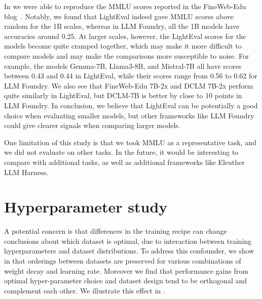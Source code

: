 \documentclass{article}
\begin{document}
In  we were able to reproduce the MMLU scores reported in the FineWeb-Edu blog~\citep{lozhkov2024fineweb-edu}.
Notably, we found that LightEval indeed gave MMLU scores above random for the 1B scales, whereas in LLM Foundry, all the 1B models have accuracies around 0.25.
At larger scales, however, the LightEval scores for the models become quite cramped together, which may make it more difficult to compare models and may make the comparisons more susceptible to noise.
For example, the models Gemma-7B, Llama3-8B, and Mistral-7B all have scores between 0.43 and 0.44 in LightEval, while their scores range from 0.56 to 0.62 for LLM Foundry.
We also see that FineWeb-Edu 7B-2x and DCLM 7B-2x perform quite similarly in LightEval, but DCLM-7B is better by close to 10 points in LLM Foundry.
In conclusion, we believe that LightEval can be potentially a good choice when evaluating smaller models, but other frameworks like LLM Foundry could give clearer signals when comparing larger models.

One limitation of this study is that we took MMLU as a representative task, and we did not evaluate on other tasks. In the future, it would be interesting to compare with additional tasks, as well as additional frameworks like Eleuther LLM Harness.

\section{Hyperparameter study}\label{appx:hp-ablations}
A potential concern is that differences in the training recipe can change conclusions about which dataset is optimal, due to interaction between training hyperparameters and dataset distributions.
To address this confounder, we show in  that orderings between datasets are preserved for various combinations of weight decay and learning rate.
Moreover we find that performance gains from optimal hyper-parameter choice and dataset design tend to be orthogonal and complement each other. We illustrate this effect in .
\end{document}

